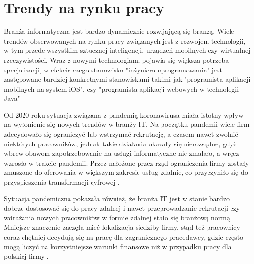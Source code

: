 



\section{Trendy na rynku pracy}

Branża informatyczna jest bardzo dynamicznie rozwijającą się branżą.
Wiele trendów obserwowanych na rynku pracy związanych jest z rozwojem technologii, w tym przede wszystkim sztucznej inteligencji, urządzeń mobilnych czy wirtualnej rzeczywistości.
Wraz z nowymi technologiami pojawia się większa potrzeba specjalizacji, w efekcie czego stanowisko "inżyniera oprogramowania" jest zastępowane bardziej konkretnymi stanowiskami takimi jak "programista aplikacji mobilnych na system iOS", czy "programista aplikacji webowych w technologii Java" \cite{it-polyglots-2015}.

Od 2020 roku sytuacja związana z pandemią koronawirusa miała istotny wpływ na wyłonienie się nowych trendów w branży IT.
Na początku pandemii wiele firm zdecydowało się ograniczyć lub wstrzymać rekrutację, a czasem nawet zwolnić niektórych pracowników, jednak takie działania okazały się nierozsądne, gdyż wbrew obawom zapotrzebowanie na usługi informatyczne nie zmalało, a wręcz wzrosło w trakcie pandemii.
Przez nałożone przez rząd ograniczenia firmy zostały zmuszone do oferowania w większym zakresie usług zdalnie, co przyczyniło się do przyspieszenia transformacji cyfrowej \cite{it-covid-2021}.

Sytuacja pandemiczna pokazała również, że branża IT jest w stanie bardzo dobrze dostosować się do pracy zdalnej i nawet przeprowadzanie rekrutacji czy wdrażania nowych pracowników w formie zdalnej stało się branżową normą.
Mniejsze znaczenie zaczęła mieć lokalizacja siedziby firmy, stąd też pracownicy coraz chętniej decydują się na pracę dla zagranicznego pracodawcy, gdzie często mogą liczyć na korzystniejsze warunki finansowe niż w przypadku pracy dla polskiej firmy \cite{it-covid-2021}.


